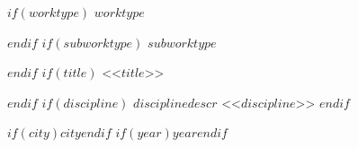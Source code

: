 \begin{titlepage}
  \bigskip
  \bigskip

  \approvedStamp
  
  \vspace{\fill}
  
  \begin{center}
  
    $if(worktype)$
    \MakeUppercase{$worktype$} \par
    \smallskip
    $endif$
    $if(subworktype)$
    $subworktype$ \par
    \smallskip
    $endif$
    $if(title)$
    <<$title$>>\par
    \smallskip
    $endif$
    $if(discipline)$
    \medskip%
    $disciplinedescr$
    <<$discipline$>>
    \bigskip
    $endif$
  \end{center}

  \vspace{\fill}
  
  \bigskip%
  \authorTable


  \begin{center}
    \vspace*{\fill}
    $if(city)${$city$}$endif$
    $if(year)${$year$}$endif$
  \end{center}
  
\end{titlepage}
\restoregeometry
